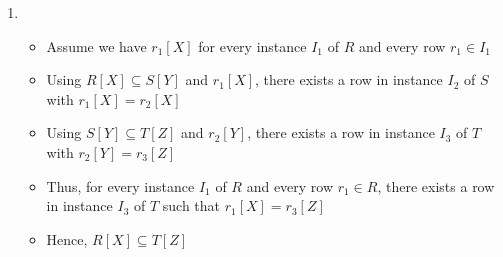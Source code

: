 \documentclass{article}
\begin{document}
\begin{enumerate}
  \item
    \begin{itemize}
      \item Assume we have $r_1[X]$ for every instance $I_1$ of $R$ and every
            row $r_1 \in I_1$
      \item Using $R[X] \subseteq S[Y]$ and $r_1[X]$, there exists a row in
            instance $I_2$ of $S$ with $r_1[X] = r_2[X]$
      \item Using $S[Y] \subseteq T[Z]$ and $r_2[Y]$, there exists a row in
            instance $I_3$ of $T$ with $r_2[Y] = r_3[Z]$
      \item Thus, for every instance $I_1$ of $R$ and every row $r_1 \in R$,
            there exists a row in instance $I_3$ of $T$ such that $r_1[X] =
            r_3[Z]$
      \item Hence, $R[X] \subseteq T[Z]$
    \end{itemize}

\end{enumerate}
\end{document}
